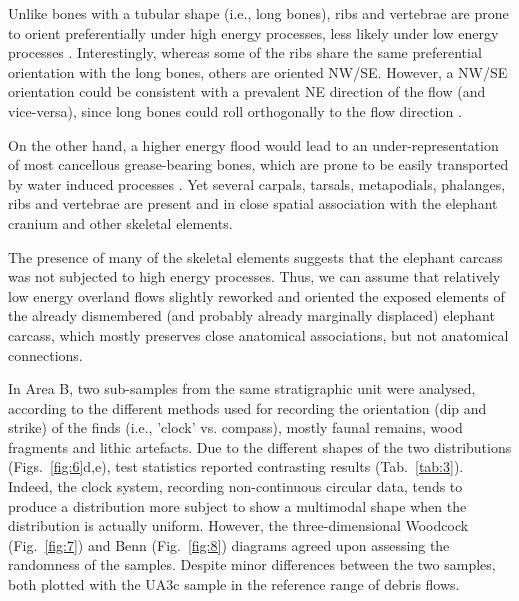 \documentclass[preprint,authoryear,times]{elsarticle} %
\begin{document}
Unlike bones with a tubular shape (i.e., long bones), ribs and vertebrae are prone to orient preferentially under high energy processes, less likely under low energy processes \citep{Dominguez-Rodrigo2013,Dominguez-Rodrigo2014}. Interestingly, whereas some of the ribs share the same preferential orientation with the long bones, others are oriented NW/SE. However, a NW/SE orientation could be consistent with a prevalent NE direction of the flow (and vice-versa), since long bones could roll orthogonally to the flow direction \citep{Voorhies1966}.

On the other hand, a higher energy flood would lead to an under-representation of most cancellous grease-bearing bones, which are prone to be easily transported by water induced processes \citep{Voorhies1966}. Yet several carpals, tarsals, metapodials, phalanges, ribs and vertebrae are present and in close spatial association with the elephant cranium and other skeletal elements.

The presence of many of the skeletal elements suggests that the elephant carcass was not subjected to high energy processes. Thus, we can assume that relatively low energy overland flows slightly reworked and oriented the exposed elements of the already dismembered (and probably already marginally displaced) elephant carcass, which mostly preserves close anatomical associations, but not anatomical connections.


In Area B, two sub-samples from the same stratigraphic unit were analysed, according to the different methods used for recording the orientation (dip and strike) of the finds (i.e., 'clock' vs. compass), mostly faunal remains, wood fragments and lithic artefacts. Due to the different shapes of the two distributions (Figs.~\ref{fig:6}d,e), test statistics reported contrasting results (Tab.~\ref{tab:3}). Indeed, the clock system, recording non-continuous circular data, tends to produce a distribution more subject to show a multimodal shape when the distribution is actually uniform. However, the three-dimensional Woodcock (Fig.~\ref{fig:7}) and Benn (Fig.~\ref{fig:8}) diagrams agreed upon assessing the randomness of the samples. Despite minor differences between the two samples, both plotted with the UA3c sample in the reference range of debris flows.
\end{document}
